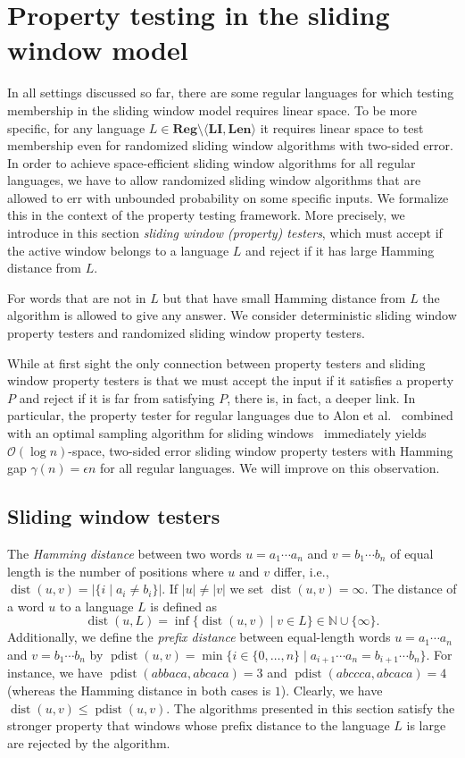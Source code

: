 \documentclass{article}\usepackage[a4paper,margin=20mm]{geometry}
\newcommand{\N}{\mathbb{N}}
\renewcommand{\O}{\mathcal{O}}
\DeclareMathOperator{\dist}{dist}
\DeclareMathOperator{\pdist}{pdist}
\newcommand{\Reg}{\mathbf{Reg}}
\newcommand{\Len}{\mathbf{Len}}
\newcommand{\LI}{\mathbf{LI}}
\renewcommand{\leq}{\leqslant}
\renewcommand{\le}{\leq}
\begin{document}
\section{Property testing in the sliding window model} \label{sec-SW-testing}

\label{chp:pt}
In all settings discussed so far, there are some regular languages for which testing membership in the sliding window model requires linear space.
To be more specific, for any language $L\in\Reg\setminus\langle \LI, \Len \rangle$ it requires linear space to test membership even for randomized sliding window algorithms with two-sided error.
In order to achieve space-efficient sliding window algorithms for all regular languages, we have
to allow randomized sliding window algorithms that are allowed to err with
unbounded probability on some specific inputs.
We formalize this in the context of the property testing framework. More precisely,
we introduce in this section {\em sliding window (property) testers},
which must accept if the active window belongs to a language $L$
and reject if it has large Hamming distance from $L$.

 For words that are not in $L$ but that have
small Hamming distance from $L$ the algorithm is allowed to give any answer.
We consider deterministic sliding window property testers
and randomized sliding window property testers.

While at first sight the only connection between property testers and sliding window property testers is that we must accept the input if it satisfies a property $P$ and reject if it is far from satisfying $P$, there is, in fact, a deeper link.
In particular, the property tester for regular languages due to Alon et al.~\cite{AlonKNS00}
combined with an optimal sampling algorithm for sliding windows~\cite{BravermanOZ12} immediately yields $\O(\log n)$-space, two-sided error sliding window property testers with Hamming gap $\gamma(n) = \epsilon n$ for all regular languages. We will improve on this observation. 

\subsection{Sliding window testers}

The {\em Hamming distance} between two words
$u = a_1 \cdots a_n$ and $v = b_1 \cdots b_n$ of equal length
is the number of positions where $u$ and $v$ differ, i.e.,~$\dist(u,v) = |\{ i \mid  a_i \neq b_i\}|$.
If $|u| \neq |v|$ we set $\dist(u,v) = \infty$.
The distance of a word $u$ to a language $L$ is defined as
\[
\dist(u,L) = \inf \{ \dist(u,v) \mid v \in L \} \in \N \cup \{\infty\}.
\]
Additionally, we define the \emph{prefix distance} between equal-length words
$u = a_1 \cdots a_n$ and $v = b_1 \cdots b_n$
by $\pdist(u,v) = \min \{ i \in \{0,\dots,n\} \mid a_{i+1} \cdots a_n = b_{i+1} \cdots b_n\}$.
For instance, we have $\pdist(abbaca, abcaca) = 3$ and $\pdist(abccca, abcaca) = 4$ (whereas the Hamming distance
in both cases is $1$).
Clearly, we have $\dist(u, v) \le \pdist(u,v)$.
The algorithms presented in this section satisfy the stronger property
that windows whose prefix distance to the language $L$ is large are rejected by the algorithm.
\end{document}
